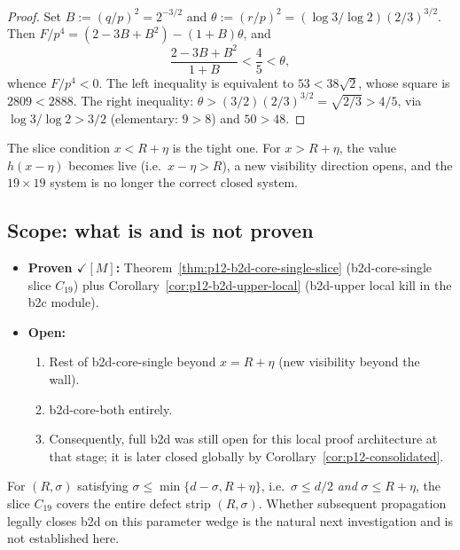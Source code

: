 \begin{proof}
Set $B := (q/p)^{2} = 2^{-3/2}$ and $\theta := (r/p)^{2}
= (\log 3 / \log 2)(2/3)^{3/2}$.  Then
$F / p^{4} = (2 - 3B + B^{2}) - (1 + B)\theta$, and
$$\frac{2 - 3B + B^{2}}{1 + B} < \frac{4}{5} < \theta,$$
whence $F/p^{4} < 0$.  The left inequality is equivalent to
$53 < 38\sqrt{2}$, whose square is $2809 < 2888$.  The right
inequality: $\theta > (3/2)(2/3)^{3/2} = \sqrt{2/3} > 4/5$, via
$\log 3/\log 2 > 3/2$ (elementary: $9 > 8$) and $50 > 48$.
\end{proof}

\begin{remark}[The genuine visibility wall at $x = R + \eta$]
\label{rem:p12-b2d-eta-wall}
The slice condition $x < R + \eta$ is the tight one.  For
$x > R + \eta$, the value $h(x - \eta)$ becomes live (i.e.\
$x - \eta > R$), a new visibility direction opens, and the
$19 \times 19$ system is no longer the correct closed system.
\end{remark}

\subsection{Scope: what is and is not proven}

\begin{itemize}
\item \textbf{Proven $\checkmark[M]$:}
  Theorem~\ref{thm:p12-b2d-core-single-slice} (b2d-core-single
  slice $C_{19}$) plus Corollary~\ref{cor:p12-b2d-upper-local}
  (b2d-upper local kill in the b2c module).
\item \textbf{Open:}
  \begin{enumerate}
  \item[(i)] Rest of b2d-core-single beyond $x = R + \eta$
    (new visibility beyond the wall).
  \item[(ii)] b2d-core-both entirely.
  \item[(iii)] Consequently, full b2d was still open for this local
    proof architecture at that stage; it is later closed globally by
    Corollary~\ref{cor:p12-consolidated}.
  \end{enumerate}
\end{itemize}

\begin{remark}[Parameter wedge with slice = full defect]
\label{rem:p12-b2d-parameter-wedge}
For $(R, \sigma)$ satisfying
$\sigma \le \min\{d - \sigma, R + \eta\}$, i.e.\
$\sigma \le d/2$ \emph{and} $\sigma \le R + \eta$, the slice
$C_{19}$ covers the entire defect strip $(R, \sigma)$.  Whether
subsequent propagation legally closes b2d on this parameter wedge
is the natural next investigation and is not established here.
\end{remark}
